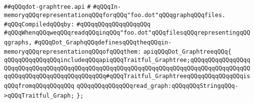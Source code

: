 \label{src/lib/std/dot/dot-graphtree.api}
\verb|##qQQqdot-graphtree.api|\newline
\verb|#|\newline
\verb|#qQQqIn-memoryqQQqrepresentationqQQqforqQQq"foo.dot"qQQqgraphqQQqfiles.|\newline
\newline
\verb|#qQQqCompiledqQQqby:|\newline
\verb|#qQQqqQQqqQQqqQQqqQQq|\newline
\newline
\verb|#qQQqWhenqQQqweqQQqreadqQQqinqQQq"foo.dot"qQQqfilesqQQqrepresentingqQQqgraphs,|\newline
\verb|#qQQqDot_GraphqQQqdefinesqQQqtheqQQqin-memoryqQQqrepresentationqQQqofqQQqthem:|\newline
\newline
\newline
\verb|apiqQQqDot_GraphtreeqQQq{|\newline
\newline
\verb|qQQqqQQqqQQqqQQqincludeqQQqapiqQQqTraitful_Graphtree;qQQqqQQqqQQqqQQqqQQqqQQqqQQqqQQqqQQqqQQqqQQqqQQqqQQqqQQqqQQqqQQqqQQqqQQqqQQqqQQqqQQqqQQqqQQqqQQqqQQqqQQqqQQqqQQqqQQq#qQQqTraitful_GraphtreeqQQqqQQqqQQqqQQqisqQQqfromqQQqqQQqqQQq|\newline
\newline
\verb|qQQqqQQqqQQqqQQqread_graph:qQQqqQQqStringqQQq->qQQqTraitful_Graph;|\newline
\verb|};|\newline

